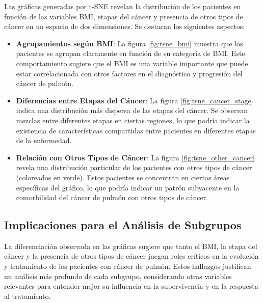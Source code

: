\documentclass[10pt,journal,compsoc]{IEEEtran}
\begin{document}
Las gráficas generadas por t-SNE revelan la distribución de los pacientes en función de las variables BMI, etapas del cáncer y presencia de otros tipos de cáncer en un espacio de dos dimensiones. Se destacan los siguientes aspectos:

\begin{itemize}
    \item \textbf{Agrupamientos según BMI}: La figura \ref{fig:tsne_bmi} muestra que los pacientes se agrupan claramente en función de su categoría de BMI. Este comportamiento sugiere que el BMI es una variable importante que puede estar correlacionada con otros factores en el diagnóstico y progresión del cáncer de pulmón.

    \item \textbf{Diferencias entre Etapas del Cáncer}: La figura \ref{fig:tsne_cancer_stage} indica una distribución más dispersa de las etapas del cáncer. Se observan mezclas entre diferentes etapas en ciertas regiones, lo que podría indicar la existencia de características compartidas entre pacientes en diferentes etapas de la enfermedad.

    \item \textbf{Relación con Otros Tipos de Cáncer}: La figura \ref{fig:tsne_other_cancer} revela una distribución particular de los pacientes con otros tipos de cáncer (coloreados en verde). Estos pacientes se concentran en ciertas áreas específicas del gráfico, lo que podría indicar un patrón subyacente en la comorbilidad del cáncer de pulmón con otros tipos de cáncer.
\end{itemize}

\subsection{Implicaciones para el Análisis de Subgrupos}

La diferenciación observada en las gráficas sugiere que tanto el BMI, la etapa del cáncer y la presencia de otros tipos de cáncer juegan roles críticos en la evolución y tratamiento de los pacientes con cáncer de pulmón. Estos hallazgos justifican un análisis más profundo de cada subgrupo, considerando otras variables relevantes para entender mejor su influencia en la supervivencia y en la respuesta al tratamiento.
\end{document}
